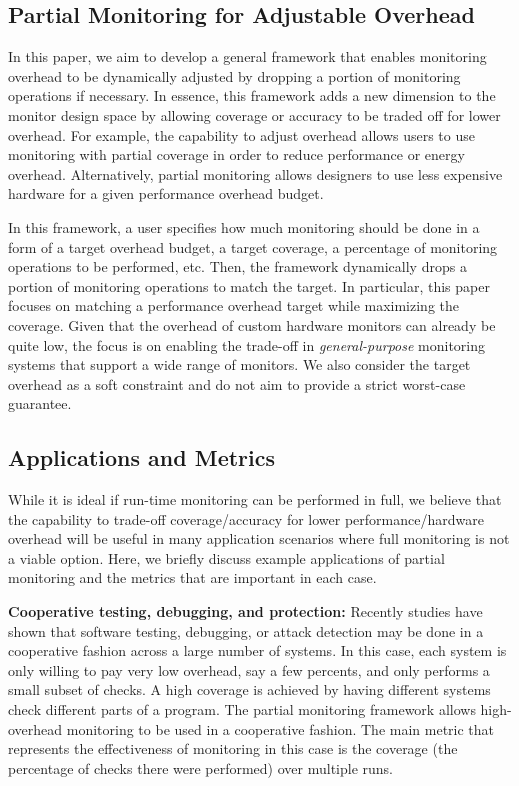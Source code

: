 \subsection{Partial Monitoring for Adjustable Overhead}

In this paper, we aim to develop a general framework that enables monitoring
overhead to be dynamically adjusted by dropping a portion of monitoring 
operations if necessary. In essence, this framework adds a new dimension to
the monitor design space by allowing coverage or accuracy to be traded off
for lower overhead. For example, the capability to adjust overhead allows users
to use monitoring with partial coverage in order to reduce performance
or energy overhead. Alternatively, partial monitoring allows designers to use
less expensive hardware for a given performance overhead budget.

In this framework, a user specifies how much monitoring should be done in a form of
a target 
overhead budget, a target coverage, a percentage of monitoring operations to be performed, etc.
Then, the framework dynamically drops a portion of monitoring operations to match
the target. In particular, this paper focuses on matching a performance overhead target
while maximizing the coverage. Given that the overhead of custom hardware monitors can
already be quite low, the focus is on enabling the trade-off in {\em general-purpose} 
monitoring systems that support a wide range of monitors.
We also consider the target overhead as a soft constraint and do not aim to
provide a strict worst-case guarantee.

\subsection{Applications and Metrics}

While it is ideal if run-time monitoring can be performed in full, we believe that
the capability to trade-off coverage/accuracy for lower performance/hardware overhead
will be useful in many application scenarios where full monitoring is not a viable option.
Here, we briefly discuss example applications of partial monitoring and the metrics
that are important in each case.

{\bf Cooperative testing, debugging, and protection:}
Recently studies \cite{FIXME} have shown that software testing, debugging,
or attack detection may be done in a cooperative fashion across
a large number of systems. In this case, each system is only willing to pay very low
overhead, say a few percents, and only performs a small subset of checks. 
A high coverage is achieved by having different systems check different parts of a program.
The partial monitoring framework allows high-overhead monitoring to be used in a
cooperative fashion. 
The main metric that represents the effectiveness of monitoring in this case is
the coverage (the percentage of checks there were performed) over multiple runs.

